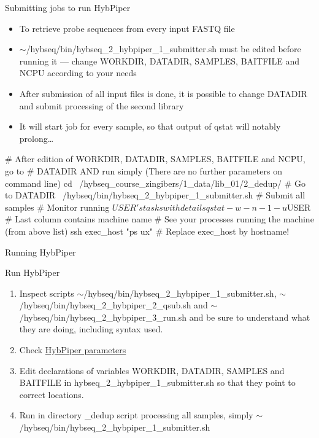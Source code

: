 \documentclass[compress,  xelatex, 11pt, xcolor=x11names, aspectratio=169,
	hyperref={
		bookmarks=true,
		unicode=true,
		colorlinks=true,
		pdftitle={HybSeq course},
		plainpages=false,
		pdfauthor={Vojtech Zeisek},
		pdfsubject={Practical processing of HybSeq target enrichment sequencing data on computing grids like MetaCentrum},
		pdfcreator={XeLaTeX},
		pdfkeywords={BASH, command line, GNU, HybSeq, Linux, MetaCentrum, sequencing shell, target enrichment},
		linkcolor=Turquoise4, %
		anchorcolor=DodgerBlue4, %
		citecolor=DodgerBlue4, %
		filecolor=DodgerBlue4, %
		menucolor=Tan4, %
		urlcolor=DarkOliveGreen4 %
		},
	url={hyphens, lowtilde} %
	]{beamer}
\renewcommand{\texttt}[1]{\colorbox{Cornsilk2}{{\ttfamily #1}}}
\renewcommand{\alert}[1]{\textcolor{OrangeRed3}{#1}}
\begin{document}
\begin{frame}[fragile]{Submitting jobs to run HybPiper}
	\begin{itemize}
		\item To retrieve probe sequences from every input FASTQ file
		\item \alert{\texttt{$\sim$/hybseq/bin/hybseq\_2\_hybpiper\_1\_submitter.sh} must be edited before running it --- change \texttt{WORKDIR}, \texttt{DATADIR}, \texttt{SAMPLES}, \texttt{BAITFILE} and \texttt{NCPU}} according to your needs
		\item After submission of all input files is done, it is possible to change \texttt{DATADIR} and submit processing of the second library
		\item It will start job for every sample, so that output of \texttt{qstat} will notably prolong\ldots
	\end{itemize}
	\begin{bashcode}
    # After edition of WORKDIR, DATADIR, SAMPLES, BAITFILE and NCPU, go to
    # DATADIR AND run simply (There are no further parameters on command line)
    cd ~/hybseq_course_zingibers/1_data/lib_01/2_dedup/ # Go to DATADIR
    ~/hybseq/bin/hybseq_2_hybpiper_1_submitter.sh # Submit all samples
    # Monitor running $USER's tasks with details
    qstat -w -n -1 -u $USER # Last column contains machine name
    # See your processes running the machine (from above list)
    ssh exec_host "ps ux" # Replace exec_host by hostname!
	\end{bashcode}
\end{frame}

\begin{frame}{Running HybPiper}
	\begin{exampleblock}{Run HybPiper}
		\begin{enumerate}
			\item Inspect scripts \texttt{$\sim$/hybseq/bin/hybseq\_2\_hybpiper\_1\_submitter.sh}, \texttt{$\sim$/hybseq/bin/hybseq\_2\_hybpiper\_2\_qsub.sh} and \texttt{$\sim$/hybseq/bin/hybseq\_2\_hybpiper\_3\_run.sh} and be sure to understand what they are doing, including syntax used.
			\item Check \href{https://github.com/mossmatters/HybPiper/wiki/Full-pipeline-parameters\#10-hybpiper-assemble}{HybPiper parameters}
			\item Edit declarations of variables \texttt{WORKDIR}, \texttt{DATADIR}, \texttt{SAMPLES} and \texttt{BAITFILE} in \texttt{hybseq\_2\_hybpiper\_1\_submitter.sh} so that they point to correct locations.
			\item Run in directory \texttt{2\_dedup} script processing all samples, simply \texttt{$\sim$/hybseq/bin/hybseq\_2\_hybpiper\_1\_submitter.sh}
		\end{enumerate}
	\end{exampleblock}
\end{frame}
\end{document}
